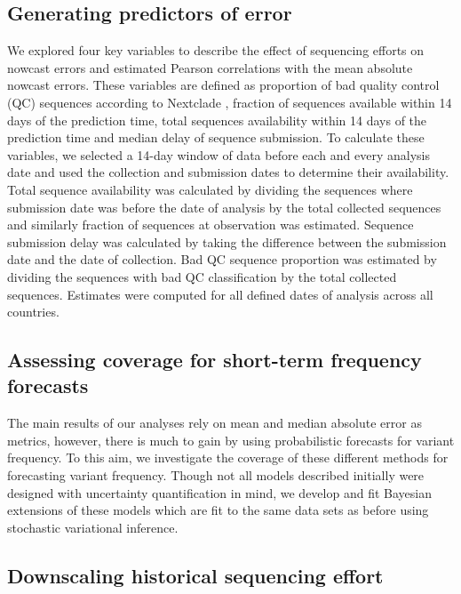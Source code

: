 \documentclass[10pt,letterpaper]{article}
\begin{document}
\subsection*{Generating predictors of error}

We explored four key variables to describe the effect of sequencing efforts on nowcast errors and estimated Pearson correlations with the mean absolute nowcast errors.
These variables are defined as proportion of bad quality control (QC) sequences according to Nextclade \cite{aksamentov2021nextclade}, fraction of sequences available within 14 days of the prediction time, total sequences availability within 14 days of the prediction time and median delay of sequence submission.
To calculate these variables, we selected a 14-day window of data before each and every analysis date and used the collection and submission dates to determine their availability.
Total sequence availability was calculated by dividing the sequences where submission date was before the date of analysis by the total collected sequences and similarly fraction of sequences at observation was estimated.
Sequence submission delay was calculated by taking the difference between the submission date and the date of collection.
Bad QC sequence proportion was estimated by dividing the sequences with bad QC classification by the total collected sequences.
Estimates were computed for all defined dates of analysis across all countries.

\subsection*{Assessing coverage for short-term frequency forecasts}

The main results of our analyses rely on mean and median absolute error as metrics, however, there is much to gain by using probabilistic forecasts for variant frequency.
To this aim, we investigate the coverage of these different methods for forecasting variant frequency.
Though not all models described initially were designed with uncertainty quantification in mind, we develop and fit Bayesian extensions of these models which are fit to the same data sets as before using stochastic variational inference.

\subsection*{Downscaling historical sequencing effort}
\end{document}
